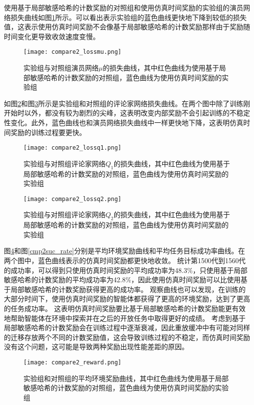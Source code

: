 使用基于局部敏感哈希的计数奖励的对照组和使用仿真时间奖励的实验组的演员网络损失曲线如图\ref{cmp2lossmu}所示。可以看出表示实验组的蓝色曲线更快地下降到较低的损失值，这表示使用仿真时间奖励不会像基于局部敏感哈希的计数奖励那样由于奖励随时间变化更导致收敛速度变慢。

        \begin{figure}[htpb]
        \centering
        \texttt{[image: compare2\_lossmu.png]}
        \caption{实验组与对照组演员网络$\mu$的损失曲线，其中红色曲线为使用基于局部敏感哈希的计数奖励的对照组，蓝色曲线为使用仿真时间奖励的实验组}
            \label{cmp2lossmu}
        \end{figure}

如图\ref{cmp2lossq1}和图\ref{cmp2lossq2}所示是实验组和对照组的评论家网络损失曲线。在两个图中除了训练刚开始时以外，都没有较为剧烈的尖峰，这表明改变内部奖励不会引起训练的不稳定性变化。此外，蓝色曲线也和演员网络损失曲线中一样更快地下降，这表明仿真时间奖励的训练过程要更快。

        \begin{figure}[htpb]
        \centering
        \texttt{[image: compare2\_lossq1.png]}
        \caption{实验组与对照组评论家网络$Q_1$的损失曲线，其中红色曲线为使用基于局部敏感哈希的计数奖励的对照组，蓝色曲线为使用仿真时间奖励的实验组}
            \label{cmp2lossq1}
        \end{figure}

        \begin{figure}[htpb]
        \centering
        \texttt{[image: compare2\_lossq2.png]}
        \caption{实验组与对照组评论家网络$Q_2$的损失曲线，其中红色曲线为使用基于局部敏感哈希的计数奖励的对照组，蓝色曲线为使用仿真时间奖励的实验组}
            \label{cmp2lossq2}
        \end{figure}

图\ref{cmp2env_reward}和图\ref{cmp2suc_rate}分别是平均环境奖励曲线和平均任务目标成功率曲线。在两个图中，蓝色曲线表示的仿真时间奖励都更快地收敛。
统计第1500代到1560代的成功率，可以得到只使用仿真时间奖励的平均成功率为48.3\%，只使用基于局部敏感哈希的计数奖励的平均成功率为42.8\%，因此使用仿真时间奖励可以比使用基于局部敏感哈希的计数奖励获得更高的成功率。
观察曲线也可以发现，在训练的大部分时间下，使用仿真时间奖励的智能体都获得了更高的环境奖励，达到了更高的任务成功率。
这表明仿真时间奖励要比基于局部敏感哈希的计数奖励能更有效地帮助智能体在环境中探索并在之后的开放任务中取得更好的成绩。
考虑到基于局部敏感哈希的计数奖励会在训练过程中逐渐衰减，因此重放缓冲中有可能对同样的迁移存放两个不同的计数奖励值，这会导致训练过程的不稳定，而仿真时间奖励没有这个问题，这可能是导致两种奖励出现性能差距的原因。
        \begin{figure}[htpb]
        \centering
        \texttt{[image: compare2\_reward.png]}
        \caption{实验组和对照组的平均环境奖励曲线，其中红色曲线为使用基于局部敏感哈希的计数奖励的对照组，蓝色曲线为使用仿真时间奖励的实验组}
            \label{cmp2env_reward}
        \end{figure}

